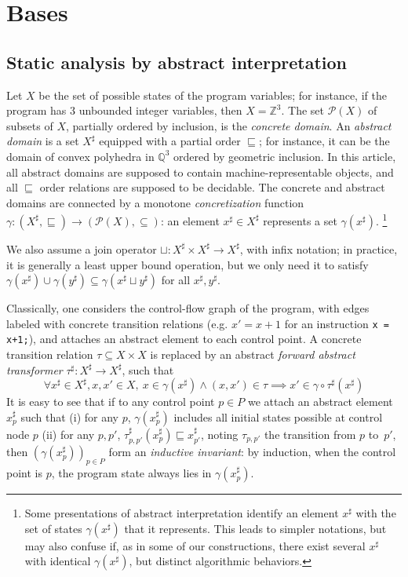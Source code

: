 \documentclass[preprint]{sigplanconf}
\newcommand{\abstr}[1]{#1^\sharp}
\newcommand{\parts}[1]{\mathscr{P}(#1)}
\newcommand{\ZZ}{\mathbb{Z}}
\newcommand{\QQ}{\mathbb{Q}}
\begin{document}
\section{Bases}
\subsection{Static analysis by abstract interpretation}
\label{sec:static_analysis}
Let $X$ be the set of possible states of the program variables; for instance, if the program has 3 unbounded integer variables, then $X = \ZZ^3$. The set $\parts{X}$ of subsets of $X$, partially ordered by inclusion, is the \emph{concrete domain}. An \emph{abstract domain} is a set $\abstr{X}$ equipped with a partial order $\sqsubseteq$; for instance, it can be the domain of convex polyhedra in $\QQ^3$ ordered by geometric inclusion. In this article, all abstract domains are supposed to contain machine-representable objects, and all $\sqsubseteq$ order relations are supposed to be decidable.
The concrete and abstract domains are connected by a monotone \emph{concretization} function $\gamma: \left(\abstr{X},\sqsubseteq\right) \rightarrow (\parts{X},\subseteq)$: an element $\abstr{x} \in \abstr{X}$ represents a set $\gamma(\abstr{x})$.%
%
\footnote{%
Some presentations of abstract interpretation identify an element $\abstr{x}$ with the set of states $\gamma(\abstr{x})$ that it represents. This leads to simpler notations, but may also confuse if, as in some of our constructions, there exist several $\abstr{x}$ with identical $\gamma(\abstr{x})$, but distinct algorithmic behaviors.}

We also assume a join operator $\sqcup: \abstr{X} \times \abstr{X} \rightarrow \abstr{X}$, with infix notation; in practice, it is generally a least upper bound operation, but we only need it to satisfy $\gamma(\abstr{x}) \cup \gamma(\abstr{y}) \subseteq \gamma(\abstr{x} \sqcup \abstr{y})$ for all $\abstr{x},\abstr{y}$.

Classically, one considers the control-flow graph of the program, with edges labeled with concrete transition relations (e.g. $x' = x+1$ for an instruction \lstinline|x = x+1;|), and attaches an abstract element to each control point.
A concrete transition relation $\tau \subseteq X \times X$ is replaced by an abstract \emph{forward abstract transformer} $\abstr{\tau}: \abstr{X} \rightarrow \abstr{X}$, such that
\begin{equation}
\forall \abstr{x} \in \abstr{X}, x,x' \in X,~
x \in \gamma(\abstr{x}) \land (x,x') \in \tau \implies
x' \in \gamma \circ \abstr{\tau}(\abstr{x})
\label{eqn:transformer_correct}
\end{equation}
It is easy to see that if to any control point $p \in P$ we attach an abstract element $\abstr{x}_p$ such that
(i) for any $p$, $\gamma(\abstr{x}_p)$ includes all initial states possible at control node $p$
(ii) for any $p,p'$, $\abstr{\tau}_{p,p'} (\abstr{x}_p) \sqsubseteq \abstr{x}_{p'}$, noting $\tau_{p,p'}$ the transition from $p$ to~$p'$, then $(\gamma(\abstr{x}_p))_{p \in P}$ form an \emph{inductive invariant}: by induction, when the control point is $p$, the program state always lies in $\gamma(\abstr{x}_p)$.
\end{document}
